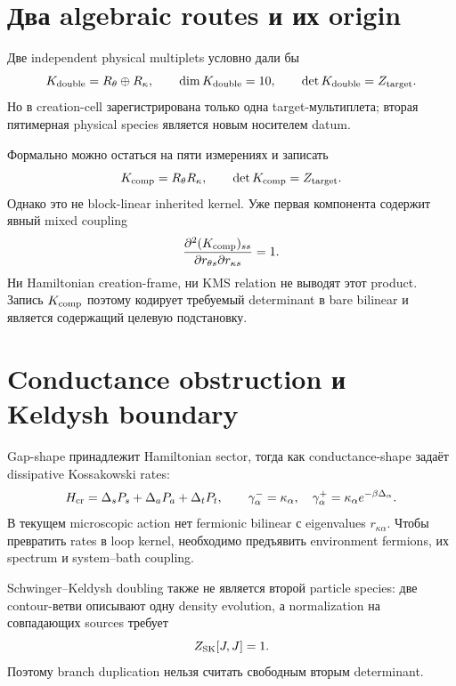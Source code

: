 \section{Два algebraic routes и их origin}

Две independent physical multiplets условно дали бы
\begin{equation}
 K_{\rm double}=R_\theta\oplus R_\kappa,
 \qquad \dim K_{\rm double}=10,
 \qquad \det K_{\rm double}=Z_{\rm target}.
 \label{eq:v9-kms-physical-loop-double}
\end{equation}
Но в creation-cell зарегистрирована только одна target-мультиплета; вторая
пятимерная physical species является новым носителем datum.

Формально можно остаться на пяти измерениях и записать
\begin{equation}
 K_{\rm comp}=R_\theta R_\kappa,
 \qquad \det K_{\rm comp}=Z_{\rm target}.
 \label{eq:v9-kms-physical-loop-composite}
\end{equation}
Однако это не block-linear inherited kernel. Уже первая компонента содержит
явный mixed coupling
\begin{equation}
 \frac{\partial^2(K_{\rm comp})_{ss}}
 {\partial r_{\theta s}\partial r_{\kappa s}}=1.
 \label{eq:v9-kms-physical-loop-mixed-derivative}
\end{equation}
Ни Hamiltonian creation-frame, ни KMS relation не выводят этот product.
Запись $K_{\rm comp}$ поэтому кодирует требуемый determinant в bare
bilinear и является содержащий целевую подстановку.

\section{Conductance obstruction и Keldysh boundary}

Gap-shape принадлежит Hamiltonian sector, тогда как conductance-shape
задаёт dissipative Kossakowski rates:
\begin{equation}
 H_{\rm cr}=\Delta_sP_s+\Delta_aP_a+\Delta_tP_t,
 \qquad
 \gamma_\alpha^-=\kappa_\alpha,
 \quad \gamma_\alpha^+=\kappa_\alpha e^{-\beta\Delta_\alpha}.
 \label{eq:v9-kms-physical-loop-sector-split}
\end{equation}
В текущем microscopic action нет fermionic bilinear с eigenvalues
$r_{\kappa\alpha}$. Чтобы превратить rates в loop kernel, необходимо
предъявить environment fermions, их spectrum и system--bath coupling.

Schwinger--Keldysh doubling также не является второй particle species:
две contour-ветви описывают одну density evolution, а normalization на
совпадающих sources требует
\begin{equation}
 Z_{\rm SK}[J,J]=1.
 \label{eq:v9-kms-physical-loop-sk-normalization}
\end{equation}
Поэтому branch duplication нельзя считать свободным вторым determinant.

